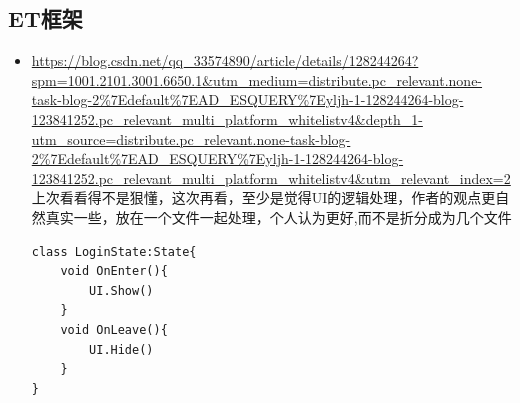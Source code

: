 \documentclass[9pt, b5paper]{article}
\begin{document}
\subsection{ET框架}
\label{sec-2-3}
\begin{itemize}
\item \url{https://blog.csdn.net/qq_33574890/article/details/128244264?spm=1001.2101.3001.6650.1&utm_medium=distribute.pc_relevant.none-task-blog-2\%7Edefault\%7EAD_ESQUERY\%7Eyljh-1-128244264-blog-123841252.pc_relevant_multi_platform_whitelistv4&depth_1-utm_source=distribute.pc_relevant.none-task-blog-2\%7Edefault\%7EAD_ESQUERY\%7Eyljh-1-128244264-blog-123841252.pc_relevant_multi_platform_whitelistv4&utm_relevant_index=2} 上次看看得不是狠懂，这次再看，至少是觉得UI的逻辑处理，作者的观点更自然真实一些，放在一个文件一起处理，个人认为更好,而不是折分成为几个文件 
\begin{verbatim}
class LoginState:State{
	void OnEnter(){
		UI.Show()
	}
	void OnLeave(){
		UI.Hide()
	}
}
\end{verbatim}
\end{itemize}
\end{document}
